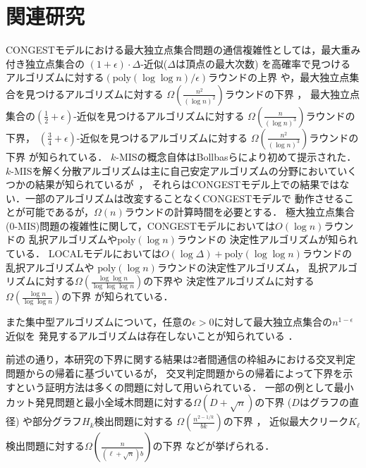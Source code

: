 \documentclass[12pt]{thesis}
\newcommand{\CONGEST}{\textsf{CONGEST}}
\newcommand{\LOCAL}{\textsf{LOCAL}}
\theoremstyle{definition}
\begin{document}
\section{関連研究} 
{\CONGEST}モデルにおける最大独立点集合問題の通信複雑性としては，最大重み付き独立点集合の
$(1 + \epsilon) \cdot \Delta$-近似($\Delta$は頂点の最大次数) を高確率で見つける
アルゴリズムに対する$\left(\mathrm{poly}(\log \log n)/\epsilon \right)$ラウンドの上界
\cite{kawarabayashi2019improved} や，最大独立点集合を見つけるアルゴリズムに対する
$\Omega \left(\frac{n^{2}}{(\log n)^{2}}\right)$ラウンドの下界 \cite{censor2017quadratic}，
最大独立点集合の$(\frac{1}{2} + \epsilon)$-近似を見つけるアルゴリズムに対する
$\Omega \left(\frac{n}{(\log n)^{3}}\right)$ラウンドの下界，
$(\frac{3}{4} + \epsilon)$-近似を見つけるアルゴリズムに対する
$\Omega \left(\frac{n^{2}}{(\log n)^{3}}\right)$ラウンドの下界 \cite{efron2020beyond} が知られている．
$k$-MISの概念自体はBollbasらにより初めて提示された\cite{bollobas1991generalised}．
$k$-MISを解く分散アルゴリズムは主に自己安定アルゴリズムの分野においていくつかの結果が知られているが~\cite{turau2007linear,tanaka2019self}，
それらは{\CONGEST}モデル上での結果ではない．一部のアルゴリズムは改変することなく{\CONGEST}モデルで
動作させることが可能であるが，$\Omega(n)$ラウンドの計算時間を必要とする．
極大独立点集合(0-MIS)問題の複雑性に関して，{\CONGEST}モデルにおいては$O(\log n)$ラウンドの
乱択アルゴリズム\cite{luby1986simple}や$\mathrm{poly}(\log n)$ラウンドの
決定性アルゴリズム\cite{rozhovn2020polylogarithmic}が知られている．
{\LOCAL}モデルにおいては$O(\log \Delta) + \mathrm{poly}(\log \log n)$ラウンドの乱択アルゴリズムや
$\mathrm{poly}(\log n)$ラウンドの決定性アルゴリズム\cite{rozhovn2020polylogarithmic}，
乱択アルゴリズムに対する$\Omega \left(\frac{\log \log n}{\log \log \log n} \right)$の下界や
決定性アルゴリズムに対する$\Omega \left(\frac{\log n}{\log \log n} \right)$の下界
\cite{balliu2019lower}が知られている．

また集中型アルゴリズムについて，任意の$\epsilon > 0$に対して最大独立点集合の$n^{1 - \epsilon}$近似を
発見するアルゴリズムは存在しないことが知られている \cite{haastad1999clique}．
 
前述の通り，本研究の下界に関する結果は2者間通信の枠組みにおける交叉判定問題からの帰着に基づいているが，
交叉判定問題からの帰着によって下界を示すという証明方法は多くの問題に対して用いられている．
一部の例として最小カット発見問題と最小全域木問題に対する$\Omega (D + \sqrt{n})$の下界
($D$はグラフの直径) \cite{sarma2012distributed}や部分グラフ$H_{k}$検出問題に対する
$\Omega \left(\frac{n^{2 - 1/k}}{bk}\right)$の下界 \cite{fischer2018possibilities}，
近似最大クリーク$K_{\ell}$検出問題に対する$\Omega \left(\frac{n}{(\ell + \sqrt{n})b}\right)$の下界
 \cite{czumaj2020detecting}などが挙げられる．
\end{document}
